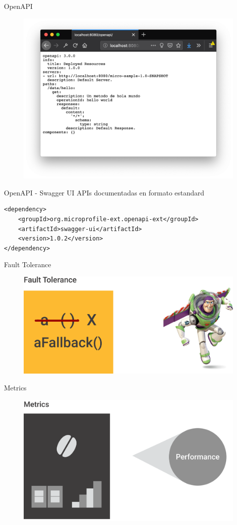 \documentclass[aspectratio=169]{beamer}
\begin{document}
\begin{frame}{OpenAPI}
\begin{figure}
	\centering
	\includegraphics[width=0.75\linewidth]{Images/openapi}
\end{figure}
\end{frame}

\begin{frame}[fragile]{OpenAPI - Swagger UI}
APIs documentadas en formato estandard
\begin{lstlisting}
<dependency>
    <groupId>org.microprofile-ext.openapi-ext</groupId>
    <artifactId>swagger-ui</artifactId>
    <version>1.0.2</version>
</dependency>
\end{lstlisting}
\end{frame}

\begin{frame}{Fault Tolerance}
\begin{figure}
	\centering
	\includegraphics[width=0.75\linewidth]{Images/faulttolerance}
\end{figure}
\end{frame}

\begin{frame}{Metrics}
\begin{figure}
	\centering
	\includegraphics[width=0.75\linewidth]{Images/metrics}
\end{figure}
\end{frame}
\end{document}
